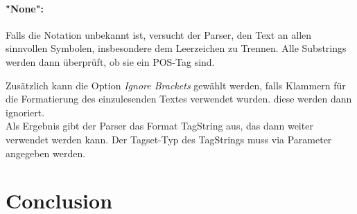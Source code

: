 \paragraph{"None":} Falls die Notation unbekannt ist, versucht der Parser, den Text an allen sinnvollen Symbolen, insbesondere dem Leerzeichen zu Trennen. Alle Substrings werden dann überprüft, ob sie ein POS-Tag sind. 

Zusätzlich kann die Option \textit{\glqq Ignore Brackets \grqq{}} gewählt werden, falls Klammern für die Formatierung des einzulesenden Textes verwendet wurden. diese werden dann ignoriert.
\\
Als Ergebnis gibt der Parser das Format TagString aus, das dann weiter verwendet werden kann. Der Tagset-Typ des TagStrings muss via Parameter angegeben werden.

\section{Conclusion}
\label{sec:system:conclusion}

